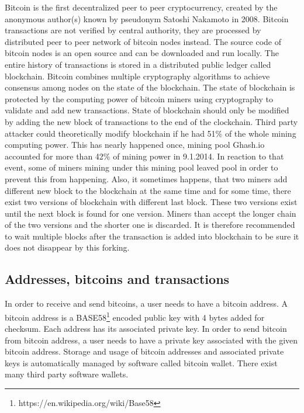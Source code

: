 \documentclass[
  digital, %
  table,   %
  lof,     %
  lot,     %
  oneside
]{fithesis3}
\begin{document}
Bitcoin \parencite{nakamoto2008bitcoin} is the first decentralized peer to peer cryptocurrency,
created by the anonymous author(s) known by pseudonym Satoshi Nakamoto in 2008.
Bitcoin transactions are not verified by central authority, they are processed by distributed peer to peer network of bitcoin nodes instead. 
The source code of bitcoin nodes is an open source and can be downloaded and run locally. 
The entire history of transactions is stored in a distributed public ledger called blockchain.
Bitcoin combines multiple cryptography algorithms to achieve consensus among nodes
on the state of the blockchain.
The state of blockchain is protected by the computing power of bitcoin miners
using cryptography to validate and add new transactions.
State of blockchain should only be modified by adding the new block of transactions to the end of the clockchain.
Third party attacker could theoretically modify blockchain if he had 51\% of the whole mining computing power.
This has nearly happened once, mining pool 
 Ghash.io accounted for more than 42\% of mining power in 9.1.2014. In reaction to that event, some of miners
 mining under this mining pool leaved pool in order to prevent this from happening.
Also, it sometimes happens, that two miners add different new block to the blockchain at the same time
and for some time, there exist two versions of blockchain with different last block.
These two versions exist until the next block is found for one version.
Miners than accept the longer chain of the two versions and the shorter one is discarded.
It is therefore recommended to wait multiple blocks after the transaction is added into blockchain
to be sure it does not disappear by this forking.
 
\subsection{Addresses, bitcoins and transactions}
In order to receive and send bitcoins, a user needs to have a bitcoin address.
A bitcoin address is a BASE58\footnote{https://en.wikipedia.org/wiki/Base58}
encoded public key with 4 bytes added for checksum.
Each address has its associated private key.
In order to send bitcoin from bitcoin address,
a user needs to have a private key associated with the given bitcoin address.
Storage and usage of bitcoin addresses and associated private keys is automatically managed
by software called bitcoin wallet. There exist many third party software wallets.
\end{document}
